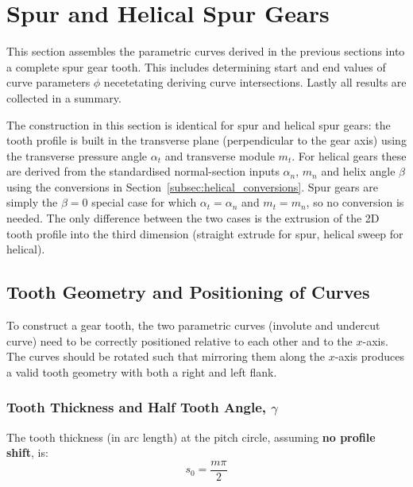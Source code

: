 \section{Spur and Helical Spur Gears}
\label{sec:spur_gears}

This section assembles the parametric curves derived in the previous sections into a complete spur gear tooth. This includes determining start and end values of curve parameters $\phi$ necetetating deriving curve intersections. Lastly all results are collected in a summary.

The construction in this section is identical for spur and helical spur gears: the tooth profile is built in the transverse plane (perpendicular to the gear axis) using the transverse pressure angle $\alpha_t$ and transverse module $m_t$. For helical gears these are derived from the standardised normal-section inputs $\alpha_n$, $m_n$ and helix angle $\beta$ using the conversions in Section~\ref{subsec:helical_conversions}. Spur gears are simply the $\beta = 0$ special case for which $\alpha_t = \alpha_n$ and $m_t = m_n$, so no conversion is needed. The only difference between the two cases is the extrusion of the 2D tooth profile into the third dimension (straight extrude for spur, helical sweep for helical).

\subsection{Tooth Geometry and Positioning of Curves}
\label{sec:tooth_geometry_positioning}
To construct a gear tooth, the two parametric curves (involute and undercut curve) need to be correctly positioned relative to each other and to the $x$-axis. The curves should be rotated such that mirroring them along the $x$-axis produces a valid tooth geometry with both a right and left flank.

\subsubsection{Tooth Thickness and Half Tooth Angle, \texorpdfstring{$\gamma$}{γ}}
\label{subsec:tooth_thickness}
The tooth thickness (in arc length) at the pitch circle, assuming \textbf{no profile shift}, is:
\begin{equation}
    s_0 = \frac{m\pi}{2}
\end{equation}

